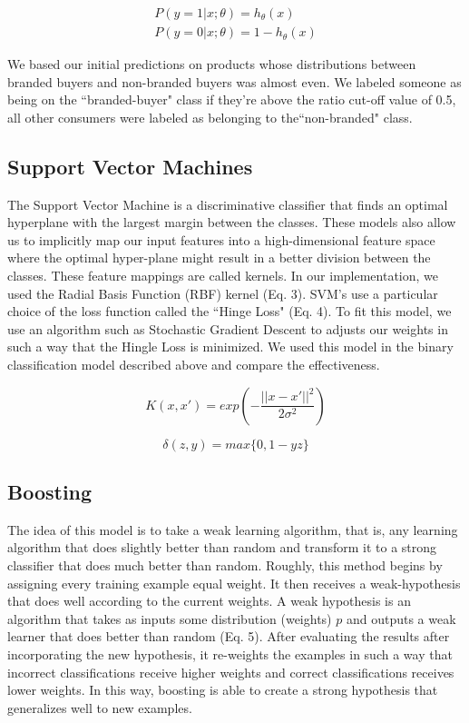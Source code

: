 \documentclass[conference]{IEEEtran}
\begin{document}
\begin{equation}
\begin{aligned}
P(y = 1 | x;\theta) = h_\theta(x) \\
P(y = 0 | x;\theta) = 1 - h_\theta(x)
\end{aligned}
\end{equation}

We based our initial predictions on products whose distributions between branded buyers and non-branded buyers was almost even. We labeled someone as being on the ``branded-buyer" class if they're above the ratio cut-off value of 0.5, all other consumers were labeled as belonging to the``non-branded" class. 

\subsection{Support Vector Machines}
The Support Vector Machine is a discriminative classifier that finds an optimal hyperplane  with the largest margin between the classes. These models also allow us to implicitly map our input features into a high-dimensional feature space where the optimal hyper-plane might result in a better division between the classes. These feature mappings are called kernels. In our implementation, we used the Radial Basis Function (RBF) kernel (Eq. 3). SVM's use a particular choice of the loss function called the ``Hinge Loss" (Eq. 4). To fit this model, we use an algorithm such as Stochastic Gradient Descent to adjusts our weights in such a way that the Hingle Loss is minimized. We used this model in the binary classification model described above and compare the effectiveness.

\begin{equation}
K(x,x') = exp (-\frac{||x-x'||^2}{2\sigma^2})
\end{equation}

\begin{equation}
\delta(z,y) = max \{0,1-yz\}
\end{equation}

\subsection{Boosting}
The idea of this model is to take a weak learning algorithm, that is, any learning algorithm that does slightly better than random and transform it to a strong classifier that does much better than random. Roughly, this method begins by assigning every training example equal weight. It then receives a weak-hypothesis that does well according to the current weights. A weak hypothesis is an algorithm that takes as inputs some distribution (weights) $p$ and outputs a weak learner that does better than random (Eq. 5). After evaluating the results after incorporating the new hypothesis, it re-weights the examples in such a way that incorrect classifications receive higher weights and correct classifications receives lower weights. In this way, boosting is able to create a strong hypothesis that generalizes well to new examples.
\end{document}
